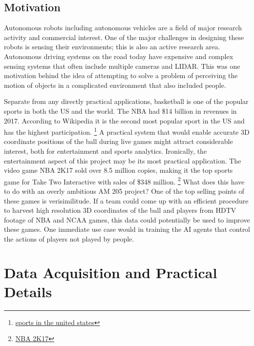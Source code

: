 \documentclass{article}
\begin{document}
\subsection{Motivation}
Autonomous robots including autonomous vehicles are a field of major research activity and commercial interest.
One of the major challenges in designing these robots is sensing their environments; this is also an active research area.
Autonomous driving systems on the road today have expensive and complex sensing systems
that often include multiple cameras and LIDAR.
This was one motivation behind the idea of attempting to solve a problem of perceiving the motion
of objects in a complicated environment that also included people.

Separate from any directly practical applications, basketball is one of the popular sports in both the US and the world.
The NBA had \$14 billion in revenues in 2017.  According to Wikipedia  it is the second most popular sport in the US
and has the highest participation.   
\footnote{\href{https://en.wikipedia.org/wiki/Sports_in_the_United_States}{sports in the united states}}
A practical system that would enable accurate 3D coordinate positions of the ball during live games might
attract considerable interest, both for entertainment and sports analytics.  
Ironically, the entertainment aspect of this project may be its most practical application.
The video game NBA 2K17 sold over 8.5 million copies, making it the top sports game for
Take Two Interactive with sales of \$348 million.
\footnote{
\href{https://venturebeat.com/2017/08/02/with-8-5-million-sales-nba-2k17-is-more-dominant-than-the-warriors/}{NBA 2K17}}
What does this have to do with an overly ambitious AM 205 project?
One of the top selling points of these games is verisimilitude.  
If a team could come up with an efficient procedure to harvest high resolution 3D coordinates of the ball and players
from HDTV footage of NBA and NCAA games, this data could potentially be used to improve these games.
One immediate use case would in training the AI agents that control the actions of players not played by people.

\newpage
\section{Data Acquisition and Practical Details}
\end{document}
